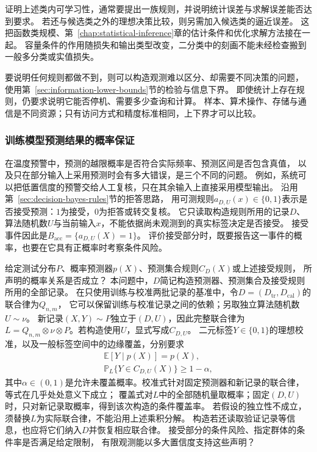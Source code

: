 证明上述类内可学习性，通常要提出一族规则，并说明统计误差与求解误差能否达到要求。
若还与候选类之外的理想决策比较，则另需加入候选类的逼近误差。
这把函数类规模、第~\ref{chap:statistical-inference}章的估计条件和优化求解方法接在一起。
容量条件的作用随损失和输出类型改变，二分类中的刻画不能未经检查搬到一般多分类或实值损失。

要说明任何规则都做不到，则可以构造观测难以区分、却需要不同决策的问题，
使用第~\ref{sec:information-lower-bounds}节的检验与信息下界。
即使统计上存在规则，仍要求说明它能否停机、需要多少查询和计算。
样本、算术操作、存储与通信是不同资源；只有访问方式和精度标准相同，上下界才可以比较。

\subsubsection{训练模型预测结果的概率保证}
\label{sec:future-analysis-reliability}

在温度预警中，预测的越限概率是否符合实际频率、预测区间是否包含真值，
以及只在部分输入上采用预测时会有多大错误，是三个不同的问题。
例如，系统可以把低置信度的预警交给人工复核，只在其余输入上直接采用模型输出。
沿用第~\ref{sec:decision-bayes-rules}节的拒答思路，
用可测规则$a_{D,U}(x)\in\{0,1\}$表示是否接受预测：$1$为接受，$0$为拒答或转交复核。
它只读取构造规则所用的记录$D$、算法随机数$U$与当前输入$x$，不能依据尚未观测到的真实标签决定是否接受。
接受事件因此是$B_{\mathrm{acc}}=\{a_{D,U}(X)=1\}$。
评价接受部分时，既要报告这一事件的概率，也要在它具有正概率时考察条件风险。

\begin{mathproblem}[预测与决策的概率关系是否满足要求]
  \label{question:future-reliability}
  给定测试分布$P$、概率预测器$p(X)$、预测集合规则$C_D(X)$或上述接受规则，
  所声明的概率关系是否成立？
  本问题中，$D$简记构造预测器、预测集合及接受规则所用的全部记录。
  在只使用训练与校准两批记录的基准中，令$D=(D_{\mathrm{tr}},D_{\mathrm{cal}})$的联合律为$Q_{n,m}$，
  它可以保留训练与校准记录之间的依赖；另取独立算法随机数$U\sim\nu$。
  新记录$(X,Y)\sim P$独立于$(D,U)$，因此完整联合律为
  $L=Q_{n,m}\otimes\nu\otimes P$。若构造使用$U$，显式写成$C_{D,U}$。
  二元标签$Y\in\{0,1\}$的理想校准，以及一般标签空间中的边缘覆盖，分别要求
  \[
    \begin{gathered}
      \mathbb E[Y\mid p(X)]=p(X),\\
      \mathbb P_L\{Y\in C_{D,U}(X)\}\geq1-\alpha,
    \end{gathered}
  \]
  其中$\alpha\in(0,1)$是允许未覆盖概率。校准式针对固定预测器和新记录的联合律，等式在几乎处处意义下成立；
  覆盖式对$L$中的全部随机量取概率；固定$(D,U)$时，只对新记录取概率，得到该次构造的条件覆盖率。
  若假设的独立性不成立，须替换$L$为实际联合律，不能沿用上述乘积分解。
  构造若还读取验证记录等信息，也应将它们纳入$D$并恢复相应联合律。
  接受部分的条件风险、指定群体的条件率是否满足给定限制，
  有限观测能以多大置信度支持这些声明？
\end{mathproblem}

